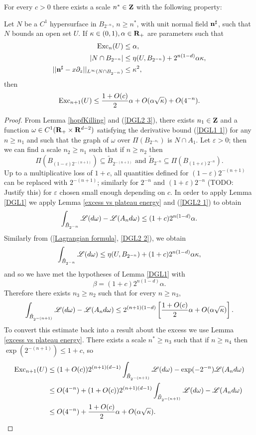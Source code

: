 \begin{lemma}\label{DGL2}
For every $c > 0$ there exists a scale $n^* \in \mathbf{Z}$ with the following property:

Let $N$ be a $C^1$ hypersurface in $B_{2^{-n}}$, $n \geq n^*$, with unit normal field $\mathbf n^\sharp$, such that $N$ bounds an open set $U$.
If $\kappa \in (0, 1), \alpha \in \mathbf{R}_+$ are parameters such that
\begin{align}
\operatorname{Exc}_n(U) &\leq \alpha, \label{DGL2 1}\\
|N \cap B_{2^{-n}}| &\leq \eta(U, B_{2^{-n}}) + 2^{n(1 - d)}\alpha \kappa, \label{DGL2 2}\\
||\mathbf n^\sharp - x\partial_z||_{L^\infty(N \cap B_{2^{-n}})} &\leq \kappa^2, \label{DGL2 3}
\end{align}
then
$$\operatorname{Exc}_{n + 1}(U) \leq \frac{1 + O(c)}{2} \alpha + O(\alpha \sqrt \kappa) + O(4^{-n}).$$
\end{lemma}
\begin{proof}
From Lemma \ref{hopfKilling} and (\ref{DGL2 3}), there exists $n_1 \in \mathbf{Z}$ and a function $\omega \in C^1(\mathbf{R}_+ \times \mathbf{R}^{d - 2})$ satisfying the derivative bound (\ref{DGL1 1}) for any $n \geq n_1$
and such that the graph of $\omega$ over $\Pi(B_{2^{-n_1}})$ is $N \cap A_1$.
Let $\varepsilon > 0$; then we can find a scale $n_2 \geq n_1$ such that if $n \geq n_2$ then
$$\Pi(B_{(1 - \varepsilon) 2^{-(n+1)}}) \subseteq \tilde B_{2^{-(n+1)}} \text{ and } \tilde B_{2^{-n}} \subseteq \Pi(B_{(1 + \varepsilon) 2^{-n}}).$$
Up to a multiplicative loss of $1 + c$, all quantities defined for $(1 - \varepsilon)2^{-(n + 1)}$ can be replaced with $2^{-(n + 1)}$; similarly for $2^{-n}$ and $(1 + \varepsilon) 2^{-n}$ (TODO: Justify this) for $\varepsilon$ chosen small enough depending on $c$.
In order to apply Lemma \ref{DGL1} we apply Lemma \ref{excess vs plateau energy} and (\ref{DGL2 1}) to obtain
$$\int_{\tilde B_{2^{-n}}} \mathscr L(d\omega) - \mathscr L(A_n d\omega) \leq (1 + c)2^{n(1 - d)}\alpha.$$
Similarly from (\ref{Lagrangian formula}, \ref{DGL2 2}), we obtain
$$\int_{\tilde B_{2^{-n}}} \mathscr L(d\omega) \leq \eta(U, B_{2^{-n}}) + (1 + c) 2^{n(1-d)}\alpha \kappa,$$
and so we have met the hypotheses of Lemma \ref{DGL1} with
$$\beta = (1 + c)2^{n(1 - d)}\alpha.$$
Therefore there exists $n_3 \geq n_2$ such that for every $n \geq n_3$,
$$\int_{\tilde B_{2^{-(n+1)}}} \mathscr L(d\omega) - \mathscr L(A_nd\omega) \leq 2^{(n + 1)(1-d)}\left[ \frac{1 + O(c)}{2} \alpha + O(\alpha \sqrt \kappa)\right].$$
To convert this estimate back into a result about the excess we use Lemma \ref{excess vs plateau energy}.
There exists a scale $n^* \geq n_3$ such that if $n \geq n_4$ then $\exp(2^{-(n + 1)}) \leq 1 + c$, so
\begin{align*}
\operatorname{Exc}_{n + 1}(U) &\leq (1 + O(c)) 2^{(n+1)(d-1)} \int_{\tilde B_{2^{-(n+1)}}} \mathscr L(d\omega) - \exp(-2^{-n}) \mathscr L(A_nd\omega)\\
&\leq O(4^{-n}) + (1 + O(c)) 2^{(n+1)(d-1)} \int_{\tilde B_{2^{-(n+1)}}} \mathscr L(d\omega) - \mathscr L(A_nd\omega)\\
&\leq O(4^{-n}) + \frac{1 + O(c)}{2} \alpha + O(\alpha \sqrt \kappa). \qedhere
\end{align*}
\end{proof}

